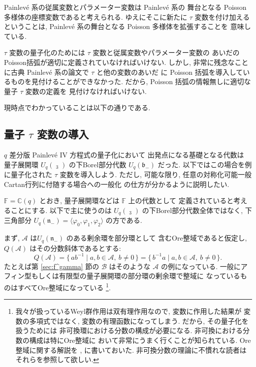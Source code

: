 \documentclass[12pt,twoside,dvipdfm]{msjproc}
\newcommand\F{{\mathbb F}} %
\newcommand\C{{\mathbb C}} %
\theoremstyle{definition} %
\theoremstyle{definition} %
\theoremstyle{definition} %
\numberwithin{theorem}{section}
\numberwithin{equation}{section}
\numberwithin{figure}{section}
\numberwithin{table}{section}
\newcommand\secref[1]{第 \ref{#1} 節}
\newcommand\bor{\mathfrak{b}}
\newcommand\nil{\mathfrak{n}}
\newcommand\bra{\langle}
\newcommand\ket{\rangle}
\newcommand\A{\mathcal{A}}
\newcommand\B{\mathcal{B}}
\newcommand\glhat{\mathop{\widehat{\mathrm{gl}}}\nolimits}
\begin{document}
Painlev\'e 系の従属変数とパラメーター変数は Painlev\'e 系の
舞台となる Poisson 多様体の座標変数であると考えられる.
ゆえにそこに新たに $\tau$ 変数を付け加えるということは,
Painlev\'e 系の舞台となる Poisson 多様体を拡張することを
意味している. 

$\tau$ 変数の量子化のためには $\tau$ 変数と従属変数やパラメーター変数の
あいだのPoisson括弧が適切に定義されていなければいけない.
しかし, 非常に残念なことに古典 Painlev\'e 系の論文で $\tau$ と他の変数のあいだ
に Poisson 括弧を導入しているものを見付けることができなかった.
だから, Poisson 括弧の情報無しに適切な量子 $\tau$ 変数の定義を
見付けなければいけない.

現時点でわかっていることは以下の通りである.



\subsection{量子 $\tau$ 変数の導入}

$q$ 差分版 Painlev\'e IV 方程式の量子化において
出発点になる基礎となる代数は
量子展開環 $U_q(\glhat_3)$ の下Borel部分代数 $U_q(\bor_-)$ だった. 
以下ではこの場合を例に量子化された $\tau$ 変数を導入しよう.
ただし, 可能な限り, 任意の対称化可能一般Cartan行列に付随する場合への一般化
の仕方が分かるように説明したい.

$\F=\C(q)$ とおき, 量子展開環などは $\F$ 上の代数として
定義されていると考えることにする.
以下で主に使うのは $U_q(\glhat_3)$ の下Borel部分代数全体ではなく, 
下三角部分 $U_q(\nil_-)=\bra\varphi_0,\varphi_1,\varphi_2\ket$
の方である.

まず, $\A$ は$U_q(\nil_-)$ のある剰余環を部分環として
含むOre整域であると仮定し, $Q(\A)$ はその分数斜体であるとする:
\begin{equation*}
 Q(\A) 
 = \{\, ab^{-1} \mid a,b\in\A,\ b\ne0 \,\}
 = \{\, b^{-1}a \mid a,b\in\A,\ b\ne0 \,\}.
\end{equation*}
たとえば\secref{sec:f^gamma}の $\B$ はそのような $\A$ の例になっている.
一般にアフィン型もしくは有限型の量子展開環の部分環の剰余環で整域に
なっているものはすべてOre整域になっている%
\footnote{我々が扱っているWeyl群作用は双有理作用なので, 変数に作用した結果が
変数の多項式ではなく, 変数の有理函数になってしまう. だから, その量子化を扱うためには
非可換環における分数の構成が必要になる. 非可換における分数の構成は特にOre整域に
おいて非常にうまく行くことが知られている.
Ore整域に関する解説を \cite{Kuroki-localization}, \cite{Kuroki-Ore} に書いておいた.
非可換分数の理論に不慣れな読者はそれらを参照して欲しい.}.
\end{document}

